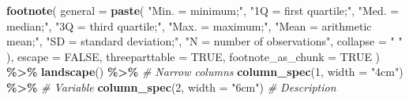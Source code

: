 \documentclass[
]{article}
\newenvironment{Shaded}{\begin{snugshade}}{\end{snugshade}}
\newcommand{\AttributeTok}[1]{\textcolor[rgb]{0.13,0.29,0.53}{#1}}
\newcommand{\CommentTok}[1]{\textcolor[rgb]{0.56,0.35,0.01}{\textit{#1}}}
\newcommand{\ConstantTok}[1]{\textcolor[rgb]{0.56,0.35,0.01}{#1}}
\newcommand{\DecValTok}[1]{\textcolor[rgb]{0.00,0.00,0.81}{#1}}
\newcommand{\FunctionTok}[1]{\textcolor[rgb]{0.13,0.29,0.53}{\textbf{#1}}}
\newcommand{\NormalTok}[1]{#1}
\newcommand{\SpecialCharTok}[1]{\textcolor[rgb]{0.81,0.36,0.00}{\textbf{#1}}}
\newcommand{\StringTok}[1]{\textcolor[rgb]{0.31,0.60,0.02}{#1}}
\begin{document}
\begin{Shaded}
\begin{Highlighting}[]
  \FunctionTok{footnote}\NormalTok{(}
    \AttributeTok{general =} \FunctionTok{paste}\NormalTok{(}
      \StringTok{"\textasciigrave{}Min.\textquotesingle{} = minimum;"}\NormalTok{,}
      \StringTok{"\textasciigrave{}1Q\textquotesingle{} = first quartile;"}\NormalTok{,}
      \StringTok{"\textasciigrave{}Med.\textquotesingle{} = median;"}\NormalTok{,}
      \StringTok{"\textasciigrave{}3Q\textquotesingle{} = third quartile;"}\NormalTok{,}
      \StringTok{"\textasciigrave{}Max.\textquotesingle{} = maximum;"}\NormalTok{,}
      \StringTok{"\textasciigrave{}Mean\textquotesingle{} = arithmetic mean;"}\NormalTok{,}
      \StringTok{"\textasciigrave{}SD\textquotesingle{} = standard deviation;"}\NormalTok{,}
      \StringTok{"\textasciigrave{}N\textquotesingle{} = number of observations"}\NormalTok{,}
      \AttributeTok{collapse =} \StringTok{" "}
\NormalTok{    ),}
    \AttributeTok{escape =} \ConstantTok{FALSE}\NormalTok{,}
    \AttributeTok{threeparttable =} \ConstantTok{TRUE}\NormalTok{,}
    \AttributeTok{footnote\_as\_chunk =} \ConstantTok{TRUE}
\NormalTok{  ) }\SpecialCharTok{\%\textgreater{}\%} 
  \FunctionTok{landscape}\NormalTok{() }\SpecialCharTok{\%\textgreater{}\%}
  \CommentTok{\# Narrow columns}
  \FunctionTok{column\_spec}\NormalTok{(}\DecValTok{1}\NormalTok{, }\AttributeTok{width =} \StringTok{"4cm"}\NormalTok{) }\SpecialCharTok{\%\textgreater{}\%}  \CommentTok{\# Variable}
  \FunctionTok{column\_spec}\NormalTok{(}\DecValTok{2}\NormalTok{, }\AttributeTok{width =} \StringTok{"6cm"}\NormalTok{) }\CommentTok{\# Description}
\end{Highlighting}
\end{Shaded}
\end{document}
